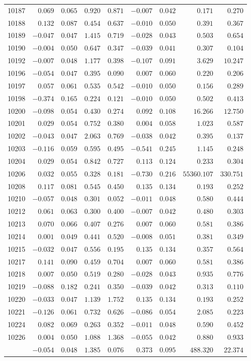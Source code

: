 \documentclass[6pt]{article}
\begin{document}
\begin{landscape}
{\begin{longtable}{lrrrrrrrr}
10187&$ 0.069$&$0.065$&$0.920$&$0.871$&$-0.007$&$0.042$&$    0.171$&$  0.270$\tabularnewline
10188&$ 0.132$&$0.087$&$0.454$&$0.637$&$-0.010$&$0.050$&$    0.391$&$  0.367$\tabularnewline
10189&$-0.047$&$0.047$&$1.415$&$0.719$&$-0.028$&$0.043$&$    0.503$&$  0.654$\tabularnewline
10190&$-0.004$&$0.050$&$0.647$&$0.347$&$-0.039$&$0.041$&$    0.307$&$  0.104$\tabularnewline
10192&$-0.007$&$0.048$&$1.177$&$0.398$&$-0.107$&$0.091$&$    3.629$&$ 10.247$\tabularnewline
10196&$-0.054$&$0.047$&$0.395$&$0.090$&$ 0.007$&$0.060$&$    0.220$&$  0.206$\tabularnewline
10197&$ 0.057$&$0.061$&$0.535$&$0.542$&$-0.010$&$0.050$&$    0.156$&$  0.289$\tabularnewline
10198&$-0.374$&$0.165$&$0.224$&$0.121$&$-0.010$&$0.050$&$    0.502$&$  0.413$\tabularnewline
10200&$-0.098$&$0.054$&$0.430$&$0.274$&$ 0.092$&$0.108$&$   16.266$&$ 12.750$\tabularnewline
10201&$ 0.029$&$0.054$&$0.752$&$0.380$&$ 0.004$&$0.058$&$    1.023$&$  0.587$\tabularnewline
10202&$-0.043$&$0.047$&$2.063$&$0.769$&$-0.038$&$0.042$&$    0.395$&$  0.137$\tabularnewline
10203&$-0.116$&$0.059$&$0.595$&$0.495$&$-0.541$&$0.245$&$    1.145$&$  0.248$\tabularnewline
10204&$ 0.029$&$0.054$&$0.842$&$0.727$&$ 0.113$&$0.124$&$    0.233$&$  0.304$\tabularnewline
10206&$ 0.032$&$0.055$&$0.328$&$0.181$&$-0.730$&$0.216$&$55360.107$&$330.751$\tabularnewline
10208&$ 0.117$&$0.081$&$0.545$&$0.450$&$ 0.135$&$0.134$&$    0.193$&$  0.252$\tabularnewline
10210&$-0.057$&$0.048$&$0.301$&$0.052$&$-0.011$&$0.048$&$    0.580$&$  0.444$\tabularnewline
10212&$ 0.061$&$0.063$&$0.300$&$0.400$&$-0.007$&$0.042$&$    0.480$&$  0.303$\tabularnewline
10213&$ 0.070$&$0.066$&$0.407$&$0.276$&$ 0.007$&$0.060$&$    0.581$&$  0.386$\tabularnewline
10214&$ 0.001$&$0.049$&$0.441$&$0.520$&$-0.008$&$0.051$&$    0.381$&$  0.349$\tabularnewline
10215&$-0.032$&$0.047$&$0.556$&$0.195$&$ 0.135$&$0.134$&$    0.357$&$  0.564$\tabularnewline
10217&$ 0.141$&$0.090$&$0.459$&$0.704$&$ 0.007$&$0.060$&$    0.581$&$  0.386$\tabularnewline
10218&$ 0.007$&$0.050$&$0.519$&$0.280$&$-0.028$&$0.043$&$    0.935$&$  0.776$\tabularnewline
10219&$-0.088$&$0.182$&$0.241$&$0.350$&$-0.039$&$0.042$&$    0.313$&$  0.110$\tabularnewline
10220&$-0.033$&$0.047$&$1.139$&$1.752$&$ 0.135$&$0.134$&$    0.193$&$  0.252$\tabularnewline
10221&$-0.126$&$0.061$&$0.732$&$0.626$&$-0.086$&$0.054$&$    2.085$&$  0.223$\tabularnewline
10224&$ 0.082$&$0.069$&$0.263$&$0.352$&$-0.011$&$0.048$&$    0.590$&$  0.452$\tabularnewline
10226&$ 0.004$&$0.050$&$1.088$&$1.368$&$-0.055$&$0.042$&$    0.880$&$  0.933$\tabularnewline
\newpage
10227&$-0.054$&$0.048$&$1.385$&$0.076$&$ 0.373$&$0.095$&$  488.320$&$ 22.374$\tabularnewline

\end{longtable}}
\end{landscape}
\end{document}
